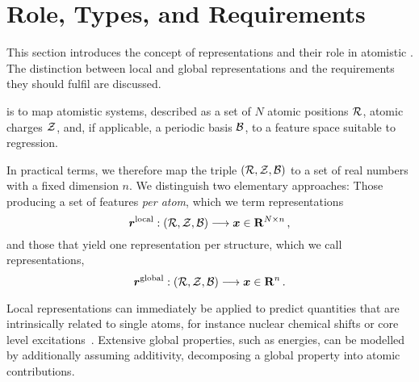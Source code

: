 
\chapter{Role, Types, and Requirements}
\label{ch:repsb}


This section introduces the concept of representations and their role in atomistic \ml. The distinction between local and global representations and the requirements they should fulfil are discussed.

 is to map atomistic systems, described as a set of $N$ atomic positions $\mathcal{R}$, atomic charges $\mathcal{Z}$, and, if applicable, a periodic basis $\mathcal{B}$, to a feature space suitable to regression.

In practical terms, we therefore map the triple $(\mathcal{R}, \mathcal{Z}, \mathcal{B})$ to a set of real numbers with a fixed dimension $n$. We distinguish two elementary approaches: Those producing a set of features \emph{per atom}, which we term  representations
\begin{equation}
	\boldsymbol{r}^{\text{local}}: (\mathcal{R}, \mathcal{Z}, \mathcal{B}) \longrightarrow \boldsymbol{x} \in {\bf R}^{N \times n} \, ,
\end{equation}
and those that yield one representation per structure, which we call  representations,
\begin{equation}
	\boldsymbol{r}^{\text{global}}: (\mathcal{R}, \mathcal{Z}, \mathcal{B}) \longrightarrow \boldsymbol{x} \in {\bf R}^n \, .
\end{equation}

Local representations can immediately be applied to predict quantities that are intrinsically related to single atoms, for instance nuclear chemical shifts or core level excitations~\cite{rrl2015q}. Extensive global properties, such as energies, can be modelled by additionally assuming additivity, decomposing a global property into atomic contributions.

